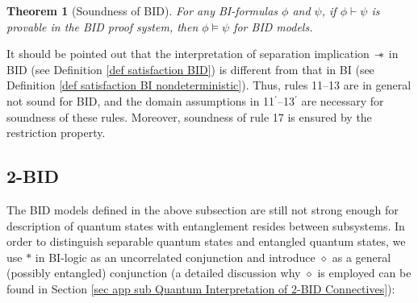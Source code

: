\documentclass[conference,compsoc, 10pt]{IEEEtran}
\newtheorem{theorem}{Theorem}[section]
\newcommand {\sepimp} {\mathrel{-\mkern-6mu*}}
\newcommand{\sd}{\diamond}%
\providecommand{\todo}[1]{{\protect\color{red}\noindent {\bf [todo]}\emph{#1} {\bf [/todo]}}}
\begin{document}
\begin{appendices}
		\begin{theorem}[Soundness of BID]
			\label{thm sound BID}
			For any BI-formulas $\phi$ and $\psi$, if $\phi\vdash\psi$ is provable in the BID proof system, then $\phi\models\psi$ for BID models.
		\end{theorem}
		
		It should be pointed out that the interpretation of separation implication $\sepimp$ in BID (see Definition \ref{def satisfaction BID}) is different from that in BI (see Definition \ref{def satisfaction BI nondeterministic}). Thus, rules 11--13 are in general not sound for BID, and the domain assumptions in 11$^\prime$--13$^\prime$ are necessary for soundness of these rules. Moreover, soundness of rule 17 is ensured by the restriction property.
		
		
		
		\subsection{2-BID}
		\label{sec BI extension}
		
		The BID models defined in the above subsection are still not strong enough for description of quantum states with entanglement resides between subsystems. 
		In order to distinguish separable quantum states and entangled quantum states, we use $\ast$ in BI-logic as an uncorrelated conjunction and introduce $\sd$ as a general (possibly entangled) conjunction (a detailed discussion why $\sd$ is employed can be found in Section \ref{sec app sub Quantum Interpretation of 2-BID Connectives}):
		

\end{appendices}
\end{document}
